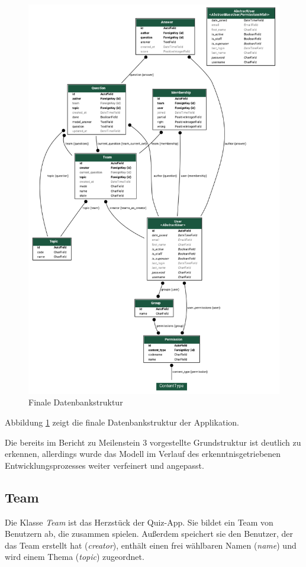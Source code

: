 \documentclass[a4paper,11pt,listof=numbered,glossary=totoc,parskip=half,toc=bib]{scrreprt}
\begin{document}
	\begin{figure}
		\centering
		\includegraphics[width=\textwidth]{models_final}
		\caption{Finale Datenbankstruktur}
		\label{fig:database}
	\end{figure}

	Abbildung \ref{fig:database} zeigt die finale Datenbankstruktur der Applikation.
	
	Die bereits im Bericht zu Meilenstein 3 vorgestellte Grundstruktur ist deutlich zu erkennen, allerdings wurde das Modell im Verlauf des erkenntnisgetriebenen Entwicklungsprozesses weiter verfeinert und angepasst.
	
		\subsection{Team}
	Die Klasse \textit{Team} ist das Herzstück der Quiz-App. Sie bildet ein Team von Benutzern ab, die zusammen spielen. Außerdem speichert sie den Benutzer, der das Team erstellt hat (\textit{creator}), enthält einen frei wählbaren Namen (\textit{name}) und wird einem Thema (\textit{topic}) zugeordnet.
	
\end{document}
